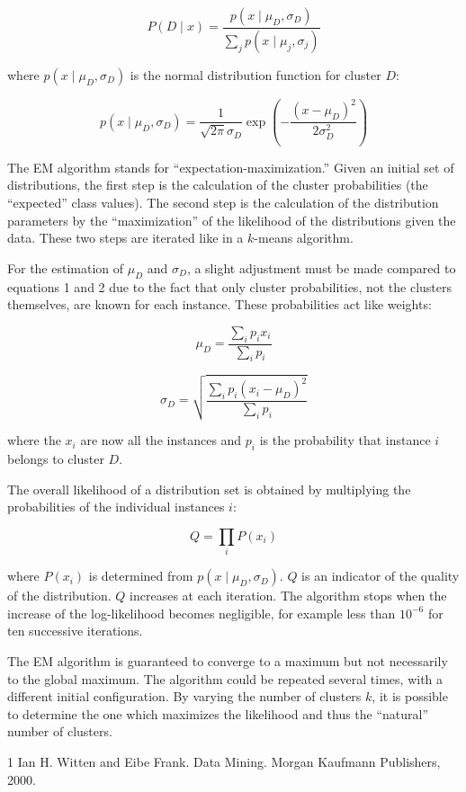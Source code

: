\documentclass[11pt]{article}
\begin{document}
\begin{equation}
P(D \mid x) =
\frac{p(x \mid \mu_D, \sigma_D)}
{\sum_j p(x \mid \mu_j, \sigma_j)}
\end{equation}

where $p(x \mid \mu_D, \sigma_D)$ is the normal distribution function for cluster $D$:

\begin{equation}
p(x \mid \mu_D, \sigma_D) =
\frac{1}{\sqrt{2\pi}\sigma_D}
\exp\left(
-\frac{(x - \mu_D)^2}{2\sigma_D^2}
\right)
\end{equation}

The EM algorithm stands for ``expectation-maximization.'' Given an initial set of distributions, the first step is the calculation of the cluster probabilities (the ``expected'' class values). The second step is the calculation of the distribution parameters by the ``maximization'' of the likelihood of the distributions given the data. These two steps are iterated like in a $k$-means algorithm.

For the estimation of $\mu_D$ and $\sigma_D$, a slight adjustment must be made compared to equations 1 and 2 due to the fact that only cluster probabilities, not the clusters themselves, are known for each instance. These probabilities act like weights:

\begin{equation}
\mu_D = \frac{\sum_i p_i x_i}{\sum_i p_i}
\end{equation}

\begin{equation}
\sigma_D =
\sqrt{
\frac{\sum_i p_i (x_i - \mu_D)^2}
{\sum_i p_i}
}
\end{equation}

where the $x_i$ are now all the instances and $p_i$ is the probability that instance $i$ belongs to cluster $D$.

The overall likelihood of a distribution set is obtained by multiplying the probabilities of the individual instances $i$:

\begin{equation}
Q = \prod_i P(x_i)
\end{equation}

where $P(x_i)$ is determined from $p(x \mid \mu_D, \sigma_D)$. $Q$ is an indicator of the quality of the distribution. $Q$ increases at each iteration. The algorithm stops when the increase of the log-likelihood becomes negligible, for example less than $10^{-6}$ for ten successive iterations.

The EM algorithm is guaranteed to converge to a maximum but not necessarily to the global maximum. The algorithm could be repeated several times, with a different initial configuration. By varying the number of clusters $k$, it is possible to determine the one which maximizes the likelihood and thus the ``natural'' number of clusters.

\begin{thebibliography}{1}
Ian H. Witten and Eibe Frank.
\newblock Data Mining.
\newblock Morgan Kaufmann Publishers, 2000.
\end{thebibliography}
\end{document}
